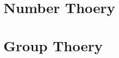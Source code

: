 \documentclass{scribe}
\begin{document}
\maketitle


\section{Number Thoery}


\section{Group Thoery}

\vspace{10mm}

\lipsum



%

\end{document}
